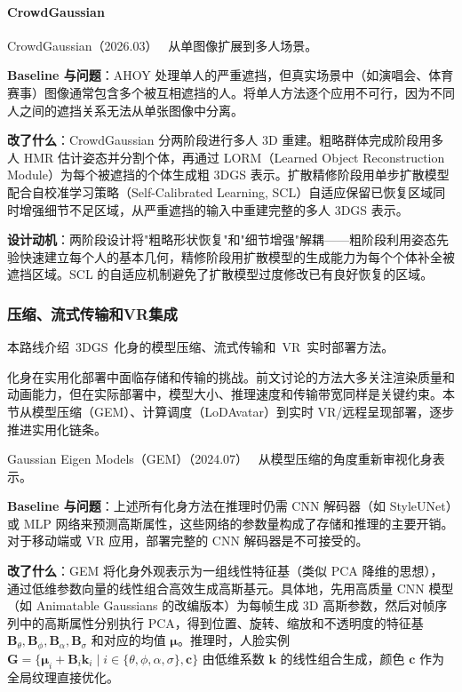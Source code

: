 \paragraph{CrowdGaussian}

CrowdGaussian（2026.03）~\cite{2603_17779} 从单图像扩展到多人场景。

\textbf{Baseline 与问题}：AHOY 处理单人的严重遮挡，但真实场景中（如演唱会、体育赛事）图像通常包含多个被互相遮挡的人。将单人方法逐个应用不可行，因为不同人之间的遮挡关系无法从单张图像中分离。

\textbf{改了什么}：CrowdGaussian 分两阶段进行多人 3D 重建。粗略群体完成阶段用多人 HMR 估计姿态并分割个体，再通过 LORM（Learned Object Reconstruction Module）为每个被遮挡的个体生成粗 3DGS 表示。扩散精修阶段用单步扩散模型配合自校准学习策略（Self-Calibrated Learning, SCL）自适应保留已恢复区域同时增强细节不足区域，从严重遮挡的输入中重建完整的多人 3DGS 表示。

\textbf{设计动机}：两阶段设计将"粗略形状恢复"和"细节增强"解耦——粗阶段利用姿态先验快速建立每个人的基本几何，精修阶段用扩散模型的生成能力为每个个体补全被遮挡区域。SCL 的自适应机制避免了扩散模型过度修改已有良好恢复的区域。

\subsubsection{压缩、流式传输和VR集成}

本路线介绍~3DGS~化身的模型压缩、流式传输和~VR~实时部署方法。

化身在实用化部署中面临存储和传输的挑战。前文讨论的方法大多关注渲染质量和动画能力，但在实际部署中，模型大小、推理速度和传输带宽同样是关键约束。本节从模型压缩（GEM）、计算调度（LoDAvatar）到实时 VR/远程呈现部署，逐步推进实用化链条。

Gaussian Eigen Models（GEM）（2024.07）~\cite{2407_04545} 从模型压缩的角度重新审视化身表示。

\textbf{Baseline 与问题}：上述所有化身方法在推理时仍需 CNN 解码器（如 StyleUNet）或 MLP 网络来预测高斯属性，这些网络的参数量构成了存储和推理的主要开销。对于移动端或 VR 应用，部署完整的 CNN 解码器是不可接受的。

\textbf{改了什么}：GEM 将化身外观表示为一组线性特征基（类似 PCA 降维的思想），通过低维参数向量的线性组合高效生成高斯基元。具体地，先用高质量 CNN 模型（如 Animatable Gaussians 的改编版本）为每帧生成 3D 高斯参数，然后对帧序列中的高斯属性分别执行 PCA，得到位置、旋转、缩放和不透明度的特征基 $\mathbf{B}_\theta, \mathbf{B}_\phi, \mathbf{B}_\alpha, \mathbf{B}_\sigma$ 和对应的均值 $\boldsymbol{\mu}$。推理时，人脸实例 $\mathbf{G} = \{\boldsymbol{\mu}_i + \mathbf{B}_i \mathbf{k}_i \mid i \in \{\theta, \phi, \alpha, \sigma\}, \mathbf{c}\}$ 由低维系数 $\mathbf{k}$ 的线性组合生成，颜色 $\mathbf{c}$ 作为全局纹理直接优化。

